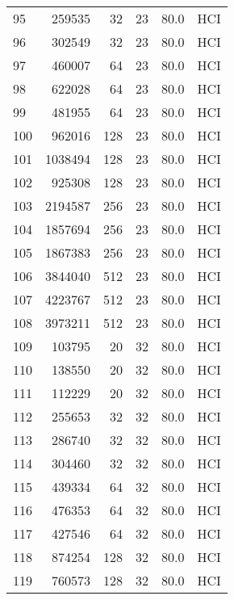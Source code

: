 \begin{longtable}{lrrrrl}
95  &    259535 &         32 &        23 &           80.0 &  HCI \\
96  &    302549 &         32 &        23 &           80.0 &  HCI \\
97  &    460007 &         64 &        23 &           80.0 &  HCI \\
98  &    622028 &         64 &        23 &           80.0 &  HCI \\
99  &    481955 &         64 &        23 &           80.0 &  HCI \\
100 &    962016 &        128 &        23 &           80.0 &  HCI \\
101 &   1038494 &        128 &        23 &           80.0 &  HCI \\
102 &    925308 &        128 &        23 &           80.0 &  HCI \\
103 &   2194587 &        256 &        23 &           80.0 &  HCI \\
104 &   1857694 &        256 &        23 &           80.0 &  HCI \\
105 &   1867383 &        256 &        23 &           80.0 &  HCI \\
106 &   3844040 &        512 &        23 &           80.0 &  HCI \\
107 &   4223767 &        512 &        23 &           80.0 &  HCI \\
108 &   3973211 &        512 &        23 &           80.0 &  HCI \\
109 &    103795 &         20 &        32 &           80.0 &  HCI \\
110 &    138550 &         20 &        32 &           80.0 &  HCI \\
111 &    112229 &         20 &        32 &           80.0 &  HCI \\
112 &    255653 &         32 &        32 &           80.0 &  HCI \\
113 &    286740 &         32 &        32 &           80.0 &  HCI \\
114 &    304460 &         32 &        32 &           80.0 &  HCI \\
115 &    439334 &         64 &        32 &           80.0 &  HCI \\
116 &    476353 &         64 &        32 &           80.0 &  HCI \\
117 &    427546 &         64 &        32 &           80.0 &  HCI \\
118 &    874254 &        128 &        32 &           80.0 &  HCI \\
119 &    760573 &        128 &        32 &           80.0 &  HCI \\

\end{longtable}
